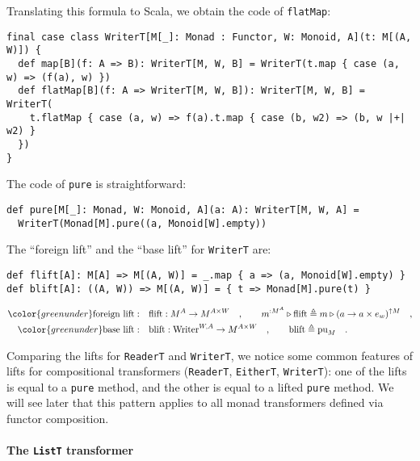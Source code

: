 Translating this formula to Scala, we obtain the code of \lstinline!flatMap!:
\begin{lstlisting}
final case class WriterT[M[_]: Monad : Functor, W: Monoid, A](t: M[(A, W)]) {
  def map[B](f: A => B): WriterT[M, W, B] = WriterT(t.map { case (a, w) => (f(a), w) })
  def flatMap[B](f: A => WriterT[M, W, B]): WriterT[M, W, B] = WriterT(
    t.flatMap { case (a, w) => f(a).t.map { case (b, w2) => (b, w |+| w2) }  
  })
}  
\end{lstlisting}
The code of \lstinline!pure! is straightforward:
\begin{lstlisting}
def pure[M[_]: Monad, W: Monoid, A](a: A): WriterT[M, W, A] =
  WriterT(Monad[M].pure((a, Monoid[W].empty))
\end{lstlisting}
The \textsf{``}foreign lift\textsf{''} and the \textsf{``}base lift\textsf{''} for \lstinline!WriterT!
are:
\begin{lstlisting}
def flift[A]: M[A] => M[(A, W)] = _.map { a => (a, Monoid[W].empty) }
def blift[A]: ((A, W)) => M[(A, W)] = { t => Monad[M].pure(t) }
\end{lstlisting}
\begin{align*}
{\color{greenunder}\text{foreign lift}:}\quad & \text{flift}:M^{A}\rightarrow M^{A\times W}\quad,\quad\quad m^{:M^{A}}\triangleright\text{flift}\triangleq m\triangleright(a\rightarrow a\times e_{w})^{\uparrow M}\quad,\\
{\color{greenunder}\text{base lift}:}\quad & \text{blift}:\text{Writer}^{W,A}\rightarrow M^{A\times W}\quad,\quad\quad\text{blift}\triangleq\text{pu}_{M}\quad.
\end{align*}

Comparing the lifts for \lstinline!ReaderT! and \lstinline!WriterT!,
we notice some common features of lifts for compositional transformers
(\lstinline!ReaderT!, \lstinline!EitherT!, \lstinline!WriterT!):
one of the lifts is equal to a \lstinline!pure! method, and the other
is equal to a lifted \lstinline!pure! method. We will see later that
this pattern applies to all monad transformers defined via functor
composition.

\paragraph{The \texttt{ListT} transformer}

